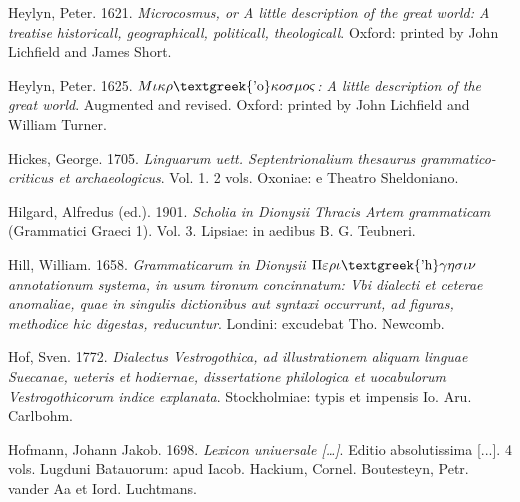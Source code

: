 \begin{styleStandard}
Heylyn, Peter. 1621. \textit{Microcosmus, or A little description of the great world: A treatise historicall, geographicall, politicall, theologicall}. Oxford: printed by John Lichfield and James Short.
\end{styleStandard}

\begin{styleStandard}
Heylyn, Peter. 1625. \textit{$M\iota \kappa \rho \text{\textgreek{'o}}\kappa o\sigma \mu o\varsigma $: A little description of the great world}. Augmented and revised. Oxford: printed by John Lichfield and William Turner.
\end{styleStandard}

\begin{styleStandard}
Hickes, George. 1705. \textit{Linguarum uett. Septentrionalium thesaurus grammatico-criticus et archaeologicus}. Vol. 1. 2 vols. Oxoniae: e Theatro Sheldoniano.
\end{styleStandard}

\begin{styleStandard}
Hilgard, Alfredus (ed.). 1901. \textit{Scholia in Dionysii Thracis Artem grammaticam} (Grammatici Graeci 1). Vol. 3. Lipsiae: in aedibus B. G. Teubneri.
\end{styleStandard}

\begin{styleStandard}
Hill, William. 1658. \textit{Grammaticarum in Dionysii $\Pi \varepsilon \rho \iota \text{\textgreek{'h}}\gamma \eta \sigma \iota \nu $ annotationum systema, in usum tironum concinnatum: Vbi dialecti et ceterae anomaliae, quae in singulis dictionibus aut syntaxi occurrunt, ad figuras, methodice hic digestas, reducuntur}. Londini: excudebat Tho. Newcomb.
\end{styleStandard}

\begin{styleStandard}
Hof, Sven. 1772. \textit{Dialectus Vestrogothica, ad illustrationem aliquam linguae Suecanae, ueteris et hodiernae, dissertatione philologica et uocabulorum Vestrogothicorum indice explanata}. Stockholmiae: typis et impensis Io. Aru. Carlbohm.
\end{styleStandard}

\begin{styleStandard}
Hofmann, Johann Jakob. 1698. \textit{Lexicon uniuersale […]}. Editio absolutissima [...]. 4 vols. Lugduni Batauorum: apud Iacob. Hackium, Cornel. Boutesteyn, Petr. vander Aa et Iord. Luchtmans.
\end{styleStandard}

